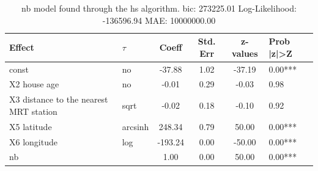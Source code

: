 \begin{table}
	\caption{nb model found through the hs algorithm. bic: 273225.01 Log-Likelihood: -136596.94 MAE: 10000000.00}
	\begin{center}
		\begin{tabular}{|l|l|c|c|c|l|}
			\hline
			Effect & $\tau$ & Coeff & Std. Err & z-values & Prob |z|>Z \\
			\hline
			const & no & -37.88 & 1.02 & -37.19 & 0.00*** \\
			\hline
			X2 house age & no & -0.01 & 0.29 & -0.03 & 0.98 \\
			\hline
			X3 distance to the nearest MRT station & sqrt & -0.02 & 0.18 & -0.10 & 0.92 \\
			\hline
			X5 latitude & arcsinh & 248.34 & 0.79 & 50.00 & 0.00*** \\
			\hline
			X6 longitude & log & -193.24 & 0.00 & -50.00 & 0.00*** \\
			\hline
			nb &  & 1.00 & 0.00 & 50.00 & 0.00*** \\
			\hline
		\end{tabular}
	\end{center}
\end{table}